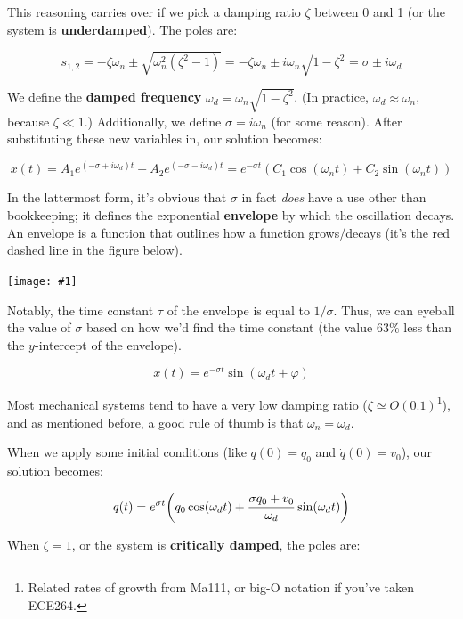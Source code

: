 \documentclass{report}
\newcommand{\bicture}[1]{
\begin{center}
    {\texttt{[image: \#1]}}
\end{center}}
\begin{document}
\begin{onehalfspacing}
\begin{flushleft}
This reasoning carries over if we pick a damping ratio \(\zeta\) between 0 and 1 (or the system is \textbf{underdamped}). The poles are:

\vspace{-0.1in}
\[s_{1, 2} = -\zeta \omega_n \pm \sqrt{\omega_n^2 (\zeta^2 - 1)} = -\zeta \omega_n \pm i \omega_n \sqrt{1 - \zeta^2} = \sigma \pm i \omega_d\] 

We define the \textbf{damped frequency} \(\omega_d = \omega_n \sqrt{1-\zeta^2}\). (In practice, \(\omega_d \approx \omega_n\), because \(\zeta \ll 1\).) Additionally, we define \(\sigma = i\omega_n\) (for some reason). After substituting these new variables in, our solution becomes:

\vspace{-0.1in}
\[x(t) = A_1 e^{(-\sigma + i\omega_d) t} + A_2 e^{(-\sigma - i\omega_d) t} = e^{-\sigma t} (C_1 \cos(\omega_n t) + C_2 \sin(\omega_n t))\]

In the lattermost form, it's obvious that \(\sigma\) in fact \textit{does} have a use other than bookkeeping; it defines the exponential \textbf{envelope} by which the oscillation decays. An envelope is a function that outlines how a function grows/decays (it's the red dashed line in the figure below).

\bicture{5_env}

Notably, the time constant \(\tau\) of the envelope is equal to \(1/\sigma\). Thus, we can eyeball the value of \(\sigma\) based on how we'd find the time constant (the value \(63\%\) less than the \(y\)-intercept of the envelope).

\vspace{-0.1in}
\[x(t) = e^{-\sigma t} \sin(\omega_d t + \varphi)\]

Most mechanical systems tend to have a very low damping ratio (\(\zeta \simeq O(0.1)\)\footnote{Related rates of growth from Ma111, or big-O notation if you've taken ECE264.}), and as mentioned before, a good rule of thumb is that \(\omega_n = \omega_d\).

\medskip

When we apply some initial conditions (like \(q(0) = q_0\) and \(\dot{q}(0) = v_0\)), our solution becomes:

\vspace{-0.1in}
\[q(t) = e^{\sigma t} \qty(q_0 \cos(\omega_d t) + \frac{\sigma q_0 + v_0}{\omega_d} \sin(\omega_d t))\]

When \(\zeta = 1\), or the system is \textbf{critically damped}, the poles are:


\end{flushleft}
\end{onehalfspacing}
\end{document}
